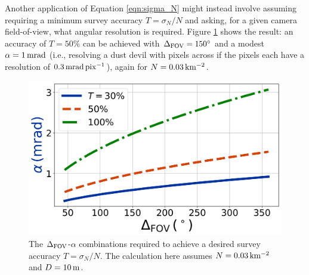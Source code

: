 \documentclass{aastex63}
\begin{document}

Another application of Equation \ref{eqn:sigma_N} might instead involve assuming requiring a minimum survey accuracy $T = \sigma_N/N$ and asking, for a given camera field-of-view, what angular resolution is required. Figure \ref{fig:alpha_vs_Delta} shows the result: an accuracy of $T = 50\%$ can be achieved with $\Delta_{\rm FOV} = 150^\circ$ and a modest $\alpha = 1\,{\rm mrad}$ (i.e., resolving a dust devil with pixels across if the pixels each have a resolution of $0.3\,{\rm mrad\, pix^{-1}}$), again for $N = 0.03\,{\rm km^{-2}}$.

\begin{figure}
    \centering
    \includegraphics[width=\textwidth]{figures/alpha_vs_Delta.jpg}
    \caption{The $\Delta_{\rm FOV}$-$\alpha$ combinations required to achieve a desired survey accuracy $T = \sigma_N/N$. The calculation here assumes $N = 0.03\,{\rm km^{-2}}$ and $D = 10\,{\rm m}$.}
    \label{fig:alpha_vs_Delta}
\end{figure}
\end{document}
